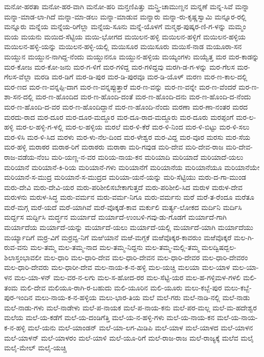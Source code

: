 ಮನೋ-ಹರತಾ
ಮನೋ-ಹರ-ವಾಗಿ
ಮನೋ-ಹರಿ
ಮನ್ತಣಿಪಿತ್ತು
ಮನ್ತ್ರಿ-ಚಾಮುಣ್ಡನ
ಮನ್ನಣೆ
ಮನ್ನ-ಸಿವೆ
ಮನ್ನಾ
ಮನ್ನಾ-ಮಾಡ-ಲಾ-ಗಿದೆ
ಮನ್ನಾ-ಮಾ-ಡಲು
ಮನ್ನಾ-ಮಾಡುವ
ಮನ್ನಾರು
ಮನ್ನಾ-ರು-ಕೃಷ್ಣಸ್ವಾಮಿ
ಮನ್ನೂರ-ರಲ್ಲಿ
ಮನ್ನೂರು
ಮನ್ನೆಯ
ಮನ್ನೆಯ-ರಿಗೆಲ್ಲಾ
ಮನ್ನೆಯ-ಸೂನು
ಮನ್ನೆ-ಯೊಳಗೆ
ಮನ್ಮಥ-ಪುಷ್ಕರ-ಣಿ-ಗ-ಳನ್ನು
ಮಮ್ಮಂ
ಮಯ
ಮಯನು
ಮಯಿದ-ಸೆಟ್ಟಿಯ
ಮಯಿ-ಭೋಗದ
ಮಯಿಲನ-ಹಳ್ಳಿ
ಮಯಿಲನ-ಹಳ್ಳಿಗೆ
ಮಯಿಲನ-ಹಳ್ಳಿಯ
ಮಯಿಲನ-ಹಳ್ಳಿ-ಯನ್ನು
ಮಯಿಲನ-ಹಳ್ಳಿ-ಯಲ್ಲಿ
ಮಯಿಸೂರ
ಮಯಿಸೂರು
ಮಯಿಸೆ-ನಾಡ
ಮಯೂರಾ-ಸನ
ಮಯ್ದುನ
ಮಯ್ದುನ-ನಾಗಿದ್ದ-ನೆಂದು
ಮಯ್ದುನನೂ
ಮಯ್ದುನ-ಹಳ್ಳಿಯ
ಮಯ್ಯಂಗಳು
ಮಯ್ವೆತ್ತ
ಮರ
ಮರ-ಕಾಡನ್ನು
ಮರ-ಕೋಜ
ಮರ-ಕೋ-ಜನು
ಮರ-ಗ-ಳಿಗೆ
ಮರ-ಗಳಿದ್ದ
ಮರ-ಗಳಿದ್ದವು
ಮರಗಿ-ಡ-ಗ-ಳನ್ನು
ಮರ-ಗೆಲಸ
ಮರ-ಗೆಲಸ-ವೆಲ್ಲಾ
ಮರಡಿ
ಮರ-ಡಿಗೆ
ಮರ-ಡಿ-ಪುರ
ಮರ-ಡಿ-ಪುರವೂ
ಮರ-ಡಿ-ಯೊಳ್
ಮರಣ
ಮರ-ಣ-ಕಾಲ-ದಲ್ಲಿ
ಮರ-ಣದ
ಮರ-ಣ-ವನ್ನಪ್ಪಿ-ದಾಗ
ಮರ-ಣ-ವನ್ನಪ್ಪುತ್ತಾರೆ
ಮರ-ಣ-ವನ್ನು
ಮರ-ಣ-ವನ್ನೇ
ಮರ-ಣ-ವೆಂದರೆ
ಮರ-ಣ-ಶಾ-ಸನ-ದಲ್ಲಿ
ಮರ-ಣ-ಹೊಂದಿದ
ಮರ-ಣ-ಹೊಂದಿ-ದಂತೆ
ಮರ-ಣ-ಹೊಂದಿ-ದನು
ಮರ-ಣ-ಹೊಂದಿ-ದ-ನೆಂದು
ಮರ-ಣ-ಹೊಂದಿ-ದ-ವರ
ಮರ-ಣ-ಹೊಂದಿದ್ದಾನೆ
ಮರ-ಣ-ಹೊಂದಿ-ನೆಂದು
ಮರಣಾ
ಮರ-ಣಾ-ನಂತರ
ಮರದ
ಮರದು-ರಾದ
ಮರ-ದೂರ
ಮರ-ದೂರ-ಮದ್ದೂರ
ಮರ-ದೂ-ರಾದ-ಮದ್ದೂರು
ಮರ-ದೂರು
ಮರಪ್ಪಂಗೆ
ಮರ-ಲ-ಹಳ್ಳಿ
ಮರ-ಲ-ಹಳ್ಳಿ-ಗ-ಳಲ್ಲಿ
ಮರ-ಲ-ಹಳ್ಳಿಯ
ಮರಲೆ
ಮರ-ಳಿ-ಕೆರೆ
ಮರ-ಳಿ-ನಿಂದ
ಮರ-ಳಿ-ಬಿಟ್ಟು
ಮರ-ಳಿ-ಸಲು
ಮರ-ಳಿಸಿ
ಮರ-ಳಿ-ಸಿದ
ಮರಳು
ಮರ-ಳು-ನೆಲ-ದಿಂದ
ಮರ-ಳೇಶ್ವರ
ಮರ-ವಿದ್ದ
ಮರ-ವೂರ
ಮರಸು
ಮರ-ಸೆಯ
ಮರ-ಹಳ್ಳಿ
ಮರಾಠರ
ಮರಾಠ-ರಿಗೆ
ಮರಾಠರು
ಮರಾಠಾ
ಮರಿ-ಗವುಡ
ಮರಿ-ದೇವ
ಮರಿ-ದೇವ-ರಾಜ
ಮರಿ-ದೇವ-ರಾಜ-ವಡೆಯ-ನೆಂಬ
ಮರಿ-ಯಣ್ಣ-ನ-ವರ
ಮರಿಯ-ನಾಯ-ಕನ
ಮರಿಯಾದಿ
ಮರಿಯಾದೆ
ಮರಿಯಾದೆ-ಯಲು
ಮರಿಯಾನೆ
ಮರಿಯಾನೆ-ಕಿ-ರಿಯ
ಮರಿಯಾನೆ-ಗಳು
ಮರಿಯಾನೆಗೆ
ಮರಿಯಾನೆಯ
ಮರಿಯಾನೆಯೂ
ಮರಿಯಾನೆಯೇ
ಮರಿಯಾನೆ-ಸ-ಮುದ್ರ
ಮರಿಯಾನೆ-ಸ-ಮುದ್ರದ
ಮರಿಯಾ-ಯನೆ-ಯನ್ನು
ಮರಿ-ಸೆಟ್ಟಿಯು
ಮರು-ದ-ಗಾ-ಮುಂಡ
ಮರು-ದೇವಿ
ಮರು-ದೇವಿ-ಯರ
ಮರು-ಪರಿಶೀಲಿಸಬೇಕಾಗುತ್ತದೆ
ಮರು-ಪರಿಶೀಲಿ-ಸಿದ
ಮರುಳ
ಮರುಳ-ದೇವ
ಮರುಳನು
ಮರುಳ-ಸಿದ್ಧ
ಮರು-ವರ್ಮನ
ಮರು-ವರ್ಮ-ನಿಗೂ
ಮರು-ವರ್ಮನು
ಮರೆ
ಮರೆ-ತ-ರೆಂದೂ
ಮರೆತೂ
ಮರೆ-ಮಗ್ಗ
ಮರೆ-ಯದೆ
ಮರೆ-ಯಾಗಿವೆ
ಮರೆ-ವೊಕ್ಕಡೆ-ಕಾವ
ಮರ್ಕುಲಿ
ಮರ್ತ್ಯ-ಲೋಕದ
ಮರ್ದಿನಿ
ಮರ್ದಿಸಿ
ಮರ್ದ್ದಸ
ಮರ್ದ್ದಿಸಿ
ಮರ್ದ್ಧನ
ಮರ್ಯಾದೆ
ಮರ್ಯಾದೆ-ಉಂಬಳಿ-ಗವು-ಡು-ಗೊಡಗೆ
ಮರ್ಯಾದೆ-ಗಾಗಿ
ಮರ್ಯಾದೆಯ
ಮರ್ಯಾದೆ-ಯನ್ನು
ಮರ್ಯಾದೆ-ಯಲು
ಮರ್ಯಾದೆ-ಯಲ್ಲಿ
ಮರ್ಯಾದೆ-ಯಾಗಿ
ಮರ್ಯಾದೆಯು
ಮರ್ಯ್ಯಾದಿಗೆ
ಮರ್ರ-ವಿಗೆ
ಮರ್ರವ್ವ-ನಿಗೆ
ಮಱಿಯಾನೆ
ಮಱೆ-ಮಗ್ಗಕೆ
ಮಱೆವೊಕ್ಕರ-ಕಾವರುಂ
ಮಱೆವೊಕ್ಕರೆ
ಮಲ-ಗಿ-ರುವ-ವನು
ಮಲ-ತಮ್ಮ
ಮಲ-ತಮ್ಮ-ನಾದ
ಮಲ-ತಮ್ಮ-ನಿದ್ದನು
ಮಲ-ತಮ್ಮ-ಮಲ್ಲಿ-ತಮ್ಮ
ಮಲದ್ವಿಷದ್ಬಲ-ಶಿಲಾಸ್ತಂಭಾವಲೀ
ಮಲ-ಧಾರಿ
ಮಲ-ಧಾರಿ-ದೇವ
ಮಲ-ಧಾರಿ-ದೇವನ
ಮಲ-ಧಾರಿ-ದೇವರ
ಮಲ-ಧಾರಿ-ದೇವರಂ
ಮಲ-ಧಾರಿ-ದೇವರು
ಮಲ-ಧಾರೀ-ದೇವ
ಮಲ-ನಾಯ-ಕ-ನ-ಹಳ್ಳಿ
ಮಲ-ಯಚ್ಚಿ
ಮಲಯಾ
ಮಲ-ಯಾಳ
ಮಲ-ಯಾ-ಳನ
ಮಲ-ಯಾ-ಳನ್
ಮಲ-ವರ-ನ-ಲಗು
ಮಲ-ಸ-ಹೋದ-ರರ
ಮಲ-ಸೆಟ್ಟಿ-ಯರ
ಮಲ-ಹ-ಗಳ್ಳಿಮಳ-ಗಳಲಿ
ಮಲಿ-ತಂಮ
ಮಲಿ-ದೇವ
ಮಲಿಯೂ-ರಾಗಿ-ರ-ಬಹುದು
ಮಲಿ-ಯೂರಿನ
ಮಲಿ-ಯೂರು
ಮಲು-ಕಬ್ಬೆ-ಪುರ
ಮಲು-ಕಬ್ಬೆ-ಪುರ-ಇಂದಿನ
ಮಲು-ನಾಯ-ಕ-ನ-ಹಳ್ಳಿಯ
ಮಲು-ಭಾರ-ತಿಯ
ಮಲೆ
ಮಲೆ-ಗರು
ಮಲೆ-ನಾಡಿ-ನಲ್ಲಿ
ಮಲೆ-ನಾಡು
ಮಲೆ-ನಾಡು-ಗಳು
ಮಲೆ-ನಾಡೇಳು
ಮಲೆ-ಪ-ನಾಯಕ
ಮಲೆ-ಪ-ನಾಯ-ಕನು
ಮಲೆ-ಪರ-ಮಲ್ಲ
ಮಲೆ-ಮ-ಹದೇಶ್ವರ
ಮಲೆಯ
ಮಲೆ-ಯ-ಕಡೆಗೆ
ಮಲೆ-ಯ-ದಂಡಿಗೆತ್ತಿ
ಮಲೆ-ಯ-ನ-ಹಳ್ಳಿ-ಗಳು
ಮಲೆ-ಯ-ನಾಯ-ಕನ
ಮಲೆ-ಯ-ನಾಯ-ಕ-ನ-ಹಳ್ಳಿ
ಮಲೆ-ಯನು
ಮಲೆ-ಯಾಂಡನ್
ಮಲೆ-ಯಾ-ಲಗ-ಮಿಡಿಪಿ
ಮಲೆ-ಯಾಳ
ಮಲೆ-ಯಾಳದ
ಮಲೆ-ಯಾಳನ
ಮಲೆ-ಯಾಳನ್
ಮಲೆ-ಯಾಳರಂ
ಮಲೆ-ಯಾಳಿ
ಮಲೆ-ಯೂ-ರಿಗೆ
ಮಲೆ-ರಾಜ-ರಾಜ
ಮಲೆ-ರಾಜ್ಯಕ್ಕೆ
ಮಲೆವ
ಮಲೈ
ಮಲೈ-ಮೇಲ್
ಮಲೈ-ಯಚ್ಚಿ
